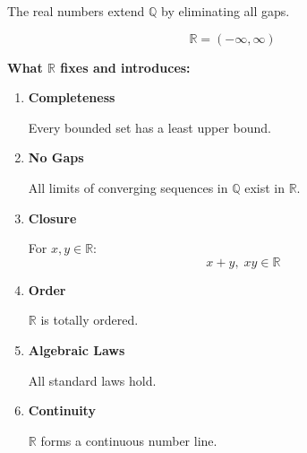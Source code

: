 \documentclass[11pt]{article}
\newcommand{\Q}{\mathbb{Q}}
\newcommand{\R}{\mathbb{R}}
\begin{document}
\begin{theorybox}

The real numbers extend $\Q$ by eliminating all gaps.

\[
\R = (-\infty, \infty)
\]

\textbf{What $\R$ fixes and introduces:}

\begin{enumerate}

\item \textbf{Completeness}

Every bounded set has a least upper bound.

\item \textbf{No Gaps}

All limits of converging sequences in $\Q$ exist in $\R$.

\item \textbf{Closure}

For $x,y \in \R$:
\[
x+y, \; xy \in \R
\]

\item \textbf{Order}

$\R$ is totally ordered.

\item \textbf{Algebraic Laws}

All standard laws hold.

\item \textbf{Continuity}

$\R$ forms a continuous number line.

\end{enumerate}

\end{theorybox}

\begin{center}
\end{center}
\end{document}
